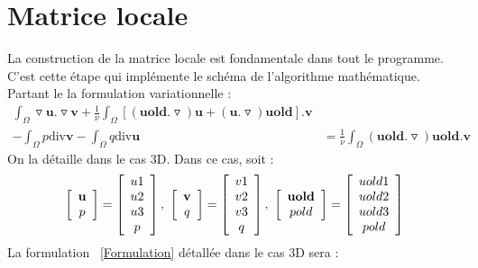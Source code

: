 \documentclass{book}
\begin{document}
\section{Matrice locale}
La construction de la matrice locale est fondamentale dans tout le programme. C'est cette étape qui implémente le schéma de l'algorithme mathématique. Partant le la formulation variationnelle : 
\begin{equation}
\label{Formulation}
\begin{array}{rl}
\int_{\Omega} \triangledown \textbf{u}.\triangledown \textbf{v}
+\frac{1}{\nu}\int_{\Omega} [( \textbf{uold}. \triangledown) \textbf{u}+ (\textbf{u} .\triangledown) \textbf{uold}].\textbf{v} &\\ 

-\int_{\Omega} p\text{div}\textbf{v}
 
-\int_{\Omega} q\text{div}\textbf{u} &=

 \frac{1}{\nu}\int_{\Omega}(\textbf{uold}.\triangledown)\textbf{uold}.\textbf{v}
\end{array}
\end{equation}
On la détaille dans le cas 3D. Dans ce  cas, soit :
\[
\left[
\begin{array}{cc}
\textbf{u} \\
p
\end{array}
\right]
=
\left[
\begin{array}{cccc}
u1 \\
u2 \\
u3 \\
p
\end{array}
\right]
\hbox{,  }
\left[
\begin{array}{cc}
\textbf{v} \\
q
\end{array}
\right]
=
\left[
\begin{array}{cccc}
v1 \\
v2 \\
v3 \\
q
\end{array}
\right]
\hbox{,  }
\left[
\begin{array}{cc}
\textbf{uold} \\
pold
\end{array}
\right]
=
\left[
\begin{array}{cccc}
uold1 \\
uold2 \\
uold3 \\
pold
\end{array}
\right]
\]
La formulation ~\eqref{Formulation} détallée dans le cas 3D sera :
\end{document}
